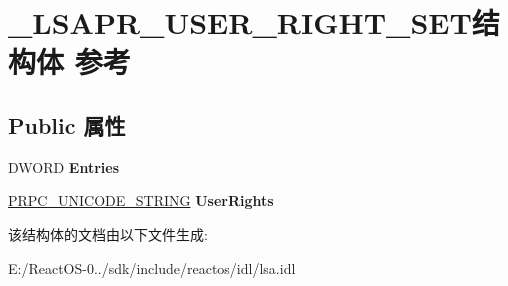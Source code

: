 \hypertarget{struct___l_s_a_p_r___u_s_e_r___r_i_g_h_t___s_e_t}{}\section{\+\_\+\+L\+S\+A\+P\+R\+\_\+\+U\+S\+E\+R\+\_\+\+R\+I\+G\+H\+T\+\_\+\+S\+E\+T结构体 参考}
\label{struct___l_s_a_p_r___u_s_e_r___r_i_g_h_t___s_e_t}
\subsection*{Public 属性}
\begin{DoxyCompactItemize}
\item 
\mbox{\label{struct___l_s_a_p_r___u_s_e_r___r_i_g_h_t___s_e_t_ac7a235cab42804b66aed4c8ea16b5013}} 
D\+W\+O\+RD {\bfseries Entries}
\item 
\mbox{\label{struct___l_s_a_p_r___u_s_e_r___r_i_g_h_t___s_e_t_a1477bec3023e68461239bc95d16c904e}} 
\hyperlink{struct___r_p_c___u_n_i_c_o_d_e___s_t_r_i_n_g}{P\+R\+P\+C\+\_\+\+U\+N\+I\+C\+O\+D\+E\+\_\+\+S\+T\+R\+I\+NG} {\bfseries User\+Rights}
\end{DoxyCompactItemize}


该结构体的文档由以下文件生成\+:\begin{DoxyCompactItemize}
\item 
E\+:/\+React\+O\+S-\/0../sdk/include/reactos/idl/lsa.\+idl\end{DoxyCompactItemize}
